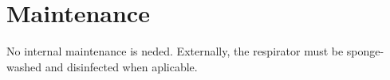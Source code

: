 \section{Maintenance}
    No internal maintenance is neded. Externally, the respirator must be sponge-washed and disinfected when aplicable.
